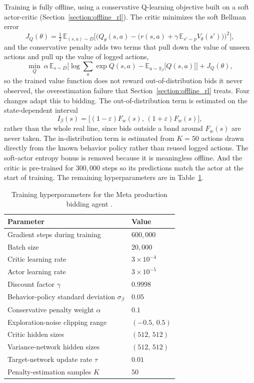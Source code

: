 Training is fully offline, using a conservative Q-learning objective built on a soft actor-critic (Section~\ref{section:offline_rl}). The critic minimizes the soft Bellman error
\begin{equation}
J_Q(\theta)=\tfrac12\,\mathbb{E}_{(s,a)\sim D}\Big[\big(Q_\theta(s,a)-\big(r(s,a)+\gamma\,\mathbb{E}_{s'\sim p}V_\theta(s')\big)\big)^2\Big],
\end{equation}
and the conservative penalty adds two terms that pull down the value of unseen actions and pull up the value of logged actions,
\begin{equation}
\min_Q\ \alpha\,\mathbb{E}_{s\sim D}\Big[\log\!\sum_a\exp Q(s,a)-\mathbb{E}_{a\sim\hat\pi_\beta}\big[Q(s,a)\big]\Big]+J_Q(\theta),
\end{equation}
so the trained value function does not reward out-of-distribution bids it never observed, the overestimation failure that Section~\ref{section:offline_rl} treats. Four changes adapt this to bidding. The out-of-distribution term is estimated on the state-dependent interval
\begin{equation}
I_\beta(s)=\big[(1-\varepsilon)F_w(s),\,(1+\varepsilon)F_w(s)\big],
\end{equation}
rather than the whole real line, since bids outside a band around $F_w(s)$ are never taken. The in-distribution term is estimated from $K=50$ actions drawn directly from the known behavior policy rather than reused logged actions. The soft-actor entropy bonus is removed because it is meaningless offline. And the critic is pre-trained for $300{,}000$ steps so its predictions match the actor at the start of training. The remaining hyperparameters are in Table~\ref{tab:meta_bidding_hparams}.

\begin{table}[t]
\centering
\small
\begin{tabular}{ll}
\toprule
Parameter & Value \\
\midrule
Gradient steps during training & $600{,}000$ \\
Batch size & $20{,}000$ \\
Critic learning rate & $3\times10^{-4}$ \\
Actor learning rate & $3\times10^{-5}$ \\
Discount factor $\gamma$ & $0.9998$ \\
Behavior-policy standard deviation $\sigma_\beta$ & $0.05$ \\
Conservative penalty weight $\alpha$ & $0.1$ \\
Exploration-noise clipping range & $(-0.5,\,0.5)$ \\
Critic hidden sizes & $(512,\,512)$ \\
Variance-network hidden sizes & $(512,\,512)$ \\
Target-network update rate $\tau$ & $0.01$ \\
Penalty-estimation samples $K$ & $50$ \\
\bottomrule
\end{tabular}
\caption{Training hyperparameters for the Meta production bidding agent \citep{Korenkevych2023MetaBidding}.}
\label{tab:meta_bidding_hparams}
\end{table}

